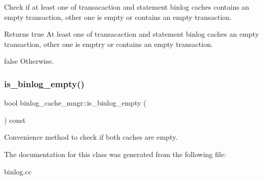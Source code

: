 Check if at least one of transacaction and statement binlog caches contains an empty transaction, other one is empty or contains an empty transaction.

\begin{DoxyReturn}{Returns}
true At least one of transacaction and statement binlog caches an empty transaction, other one is emptry or contains an empty transaction. 

false Otherwise. 
\end{DoxyReturn}
\mbox{\label{classbinlog__cache__mngr_a9587d264a7571d8c7d985cb563f55fc1}} 
\subsubsection{\texorpdfstring{is\+\_\+binlog\+\_\+empty()}{is\_binlog\_empty()}}
{\footnotesize\ttfamily bool binlog\+\_\+cache\+\_\+mngr\+::is\+\_\+binlog\+\_\+empty (\begin{DoxyParamCaption}{ }\end{DoxyParamCaption}) const\hspace{0.3cm}{\ttfamily [inline]}}

Convenience method to check if both caches are empty. 

The documentation for this class was generated from the following file\+:\begin{DoxyCompactItemize}
\item 
binlog.\+cc\end{DoxyCompactItemize}
